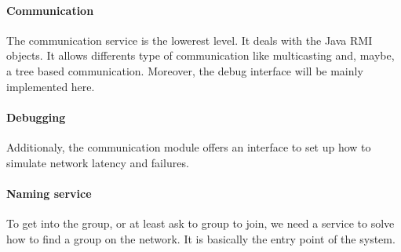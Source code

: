 \paragraph{Communication}{
	The communication service is the lowerest level. It deals
 with the Java RMI objects. It allows differents type of
 communication like multicasting and, maybe, a tree based
 communication. \newline
 Moreover, the debug interface will be mainly implemented here.
}

\paragraph{Debugging}{
	Additionaly, the communication module offers an interface
 to set up how to simulate network latency and failures.
}

\paragraph{Naming service}{
	To get into the group, or at least ask to group to join,
 we need a service to solve how to find a group on the network.
 It is basically the entry point of the system.
}
